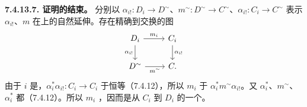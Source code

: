 \textbf{7.4.13.7. 证明的结束。} 分别以 $\alpha_{i!}:D_i\to D^\sim$、$m^\sim:D^\sim\to C^\sim$、$\alpha_{i!}:C_i\to C^\sim$ 表示 $\alpha_{i!}$、$m$ 在上的自然延伸。存在精确到交换的图
\[\begin{tikzcd}
D_i\arrow[r,"m_i"]\arrow[d,"\alpha_{i!}"']&C_i\arrow[d,"\alpha_{i!}"]\\
D^\sim\arrow[r,"m^\sim"']&C.
\end{tikzcd}\]
由于 $i$ 是，$\alpha_i^*\alpha_{i!}:C_i\to C_i$ 于恒等（7.4.12），所以 $m_i$ 于 $\alpha_i^*m^\sim\alpha_{i!}$。又 $\alpha_i^*$、$m^\sim$、$\alpha_i^*$ 都（7.4.12）。所以 $m_i$ ，因而是从 $C_i$ 到 $D_i$ 的一个。

